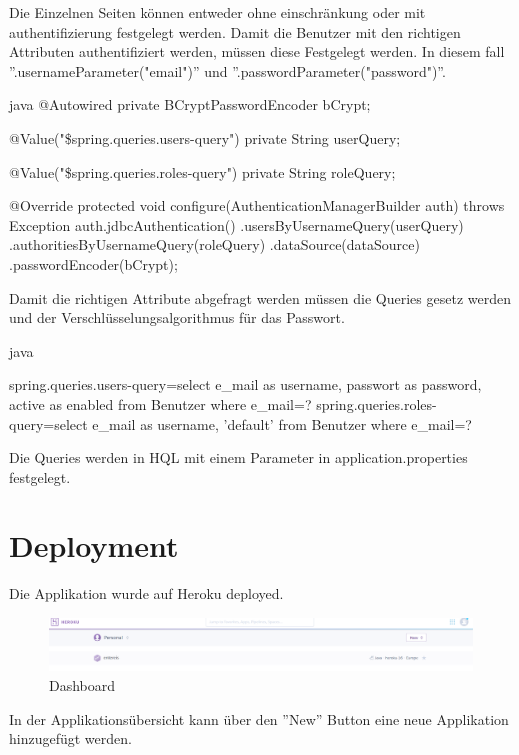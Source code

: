 Die Einzelnen Seiten können entweder ohne einschränkung oder mit authentifizierung festgelegt werden. Damit die Benutzer mit den richtigen Attributen authentifiziert werden, müssen diese Festgelegt werden. In diesem fall ''.usernameParameter("email")'' und ''.passwordParameter("password")''.

\begin{code}[]{java}
	@Autowired
	private BCryptPasswordEncoder bCrypt;
	
	 @Value("\${spring.queries.users-query}")
	private String userQuery;
	
	@Value("\${spring.queries.roles-query}")
	private String roleQuery;
	
	@Override
	protected void configure(AuthenticationManagerBuilder auth) throws Exception{
		auth.jdbcAuthentication()
		.usersByUsernameQuery(userQuery)
		.authoritiesByUsernameQuery(roleQuery)
		.dataSource(dataSource)
		.passwordEncoder(bCrypt);
	}
\end{code}

Damit die richtigen Attribute abgefragt werden müssen die Queries gesetz werden und der Verschlüsselungsalgorithmus für das Passwort.

\begin{code}[]{java}

	spring.queries.users-query=select e_mail as username, passwort as password, active as enabled from Benutzer where e_mail=?
	spring.queries.roles-query=select e_mail as username, 'default' from Benutzer where e_mail=?
	
\end{code}

Die Queries werden in HQL mit einem Parameter in application.properties festgelegt.

\section{Deployment}

Die Applikation wurde auf Heroku deployed.

\begin{figure}
	\centering
	\includegraphics[width=0.7\linewidth]{images/screenshot001}
	\caption{Dashboard}
	\label{fig:screenshot001}
\end{figure}

In der Applikationsübersicht kann über den ''New'' Button eine neue Applikation hinzugefügt werden.

